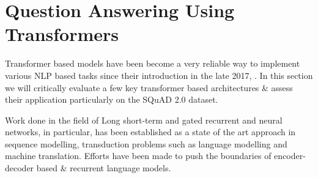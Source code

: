 \documentclass[12pt]{report}
\begin{document}
            \cite{lstmintent}

            \cite{fastQA}

	    \section{Question Answering Using Transformers}\label{23}

	        Transformer based models have been become a very reliable way to implement various NLP based tasks since their introduction in the late 2017, \citep{atayl}. In this section we will critically evaluate a few key transformer based architectures \& assess their application particularly on the SQuAD 2.0 dataset.

	        Work done in the field of Long short-term and gated recurrent \citep{lstmoriginal} and \citep{recurrent} neural networks, in particular, has been established as a state of the art approach in sequence modelling, transduction problems such as language modelling and machine translation.  Efforts have been made to push the boundaries of encoder-decoder based \& recurrent language models.
\end{document}
